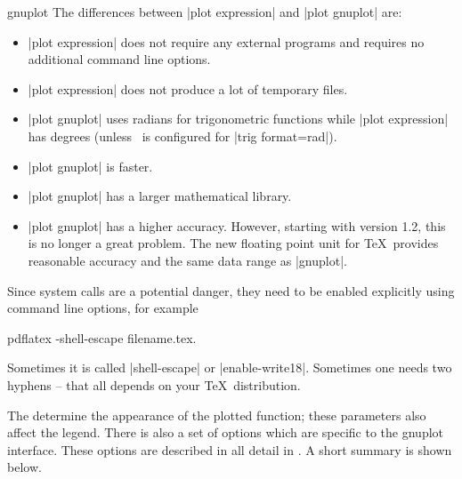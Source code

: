 {\begin{addplotoperation}[]{gnuplot}{}
The differences between |plot expression| and |plot gnuplot| are:
\begin{itemize}
	\item |plot expression| does not require any external programs and requires no additional command line options.
	\item |plot expression| does not produce a lot of temporary files.
	\item |plot gnuplot| uses radians for trigonometric functions while |plot expression| has degrees (unless \pgfname\ is configured for |trig format=rad|).
	\item |plot gnuplot| is faster.
	\item |plot gnuplot| has a larger mathematical library.
	\item |plot gnuplot| has a higher accuracy. However, starting with version 1.2, this is no longer a great problem. The new floating point unit for \TeX\ provides reasonable accuracy and the same data range as |gnuplot|.
\end{itemize}

Since system calls are a potential danger, they need to be enabled explicitly using command line options, for example
\begin{codeexample}
pdflatex -shell-escape filename.tex.
\end{codeexample}
Sometimes it is called |shell-escape| or |enable-write18|. Sometimes one needs two hyphens -- that all depends on your \TeX\ distribution.
\begin{codeexample}[]
\end{codeexample}

\begin{codeexample}[]
\end{codeexample}

The  determine the appearance of the plotted function; these parameters also affect the legend. There is also a set of options which are specific to the gnuplot interface. These options are described in all detail in \cite[section~18.6]{tikz}. A short summary is shown below.



\end{addplotoperation}}

